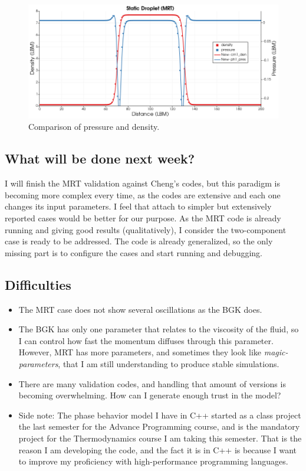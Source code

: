 \documentclass[12pt]{article}
\begin{document}
	\begin{figure}[h]
		\centering
		\includegraphics[scale=0.4]{pics/MRT_StaticDroplet_PRho.png}
		\caption{Comparison of pressure and density.}
		\label{fig:val1CMRT}
	\end{figure}
	 
	\subsection*{What will be done next week?}
	I will finish the MRT validation against Cheng's codes, but this paradigm is becoming more complex every time, as the codes are extensive and each one changes its input parameters. I feel that attach to simpler but extensively reported cases would be better for our purpose. As the MRT code is already running and giving good results (qualitatively), I consider the two-component case is ready to be addressed. The code is already generalized, so the only missing part is to configure the cases and start running and debugging. 
	
	\subsection*{Difficulties}
	\begin{itemize}
		\item The MRT case does not show several oscillations as the BGK does. 

		\item The BGK has only one parameter that relates to the viscosity of the fluid, so I can control how fast the momentum diffuses through this parameter. However, MRT has more parameters, and sometimes they look like \textit{magic-parameters}, that I am still understanding to produce stable simulations.
		\item There are many validation codes, and handling that amount of versions is becoming overwhelming. How can I generate enough trust in the model?
		\item Side note: The phase behavior model I have in C++ started as a class project the last semester for the Advance Programming course, and is the mandatory project for the Thermodynamics course I am taking this semester. That is the reason I am developing the code, and the fact it is in C++ is because I want to improve my proficiency with high-performance programming languages. 
	\end{itemize}
\end{document}

